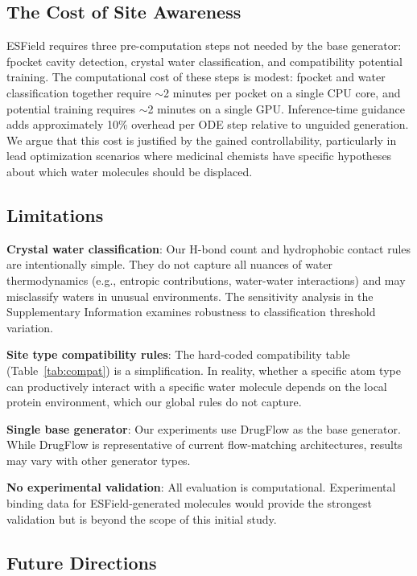 \documentclass[journal=jcisd,manuscript=article]{achemso}
\begin{document}
\subsection{The Cost of Site Awareness}

ESField requires three pre-computation steps not needed by the base generator:
fpocket cavity detection, crystal water classification, and compatibility
potential training. The computational cost of these steps is modest: fpocket
and water classification together require $\sim$2 minutes per pocket on a
single CPU core, and potential training requires $\sim$2 minutes on a single
GPU. Inference-time guidance adds approximately 10\% overhead per ODE step
relative to unguided generation. We argue that this cost is justified by the
gained controllability, particularly in lead optimization scenarios where
medicinal chemists have specific hypotheses about which water molecules should
be displaced.

\subsection{Limitations}

\textbf{Crystal water classification}: Our H-bond count and hydrophobic
contact rules are intentionally simple. They do not capture all nuances of
water thermodynamics (e.g., entropic contributions, water-water interactions)
and may misclassify waters in unusual environments. The sensitivity analysis
in the Supplementary Information examines robustness to classification
threshold variation.

\textbf{Site type compatibility rules}: The hard-coded compatibility table
(Table~\ref{tab:compat}) is a simplification. In reality, whether a specific
atom type can productively interact with a specific water molecule depends
on the local protein environment, which our global rules do not capture.

\textbf{Single base generator}: Our experiments use DrugFlow as the base
generator. While DrugFlow is representative of current flow-matching
architectures, results may vary with other generator types.

\textbf{No experimental validation}: All evaluation is computational.
Experimental binding data for ESField-generated molecules would provide the
strongest validation but is beyond the scope of this initial study.

\subsection{Future Directions}
\end{document}
